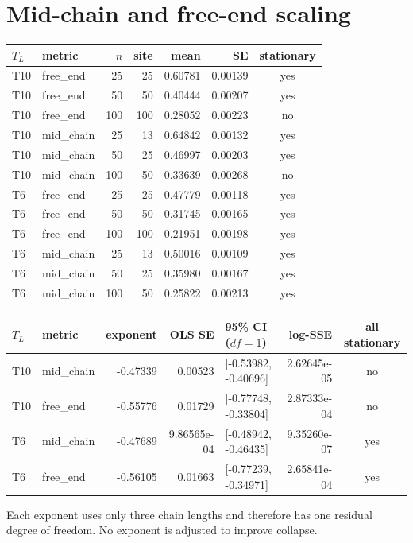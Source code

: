 \documentclass[10pt]{article}
\begin{document}
\section{Mid-chain and free-end scaling}
\scriptsize
\begin{longtable}{l l r r r r c}
\toprule
$T_L$ & metric & $n$ & site & mean & SE & stationary\\
\midrule
\endfirsthead
T10 & free\_end & 25 & 25 & 0.60781 & 0.00139 & yes \\
T10 & free\_end & 50 & 50 & 0.40444 & 0.00207 & yes \\
T10 & free\_end & 100 & 100 & 0.28052 & 0.00223 & no \\
T10 & mid\_chain & 25 & 13 & 0.64842 & 0.00132 & yes \\
T10 & mid\_chain & 50 & 25 & 0.46997 & 0.00203 & yes \\
T10 & mid\_chain & 100 & 50 & 0.33639 & 0.00268 & no \\
T6 & free\_end & 25 & 25 & 0.47779 & 0.00118 & yes \\
T6 & free\_end & 50 & 50 & 0.31745 & 0.00165 & yes \\
T6 & free\_end & 100 & 100 & 0.21951 & 0.00198 & yes \\
T6 & mid\_chain & 25 & 13 & 0.50016 & 0.00109 & yes \\
T6 & mid\_chain & 50 & 25 & 0.35980 & 0.00167 & yes \\
T6 & mid\_chain & 100 & 50 & 0.25822 & 0.00213 & yes \\
\bottomrule
\end{longtable}

\begin{longtable}{l l r r l r c}
\toprule
$T_L$ & metric & exponent & OLS SE & 95\% CI ($df=1$) & log-SSE & all stationary\\
\midrule
\endfirsthead
T10 & mid\_chain & -0.47339 & 0.00523 & [-0.53982, -0.40696] & 2.62645e-05 & no \\
T10 & free\_end & -0.55776 & 0.01729 & [-0.77748, -0.33804] & 2.87333e-04 & no \\
T6 & mid\_chain & -0.47689 & 9.86565e-04 & [-0.48942, -0.46435] & 9.35260e-07 & yes \\
T6 & free\_end & -0.56105 & 0.01663 & [-0.77239, -0.34971] & 2.65841e-04 & yes \\
\bottomrule
\end{longtable}
\normalsize
Each exponent uses only three chain lengths and therefore has one residual
degree of freedom.  No exponent is adjusted to improve collapse.
\end{document}
